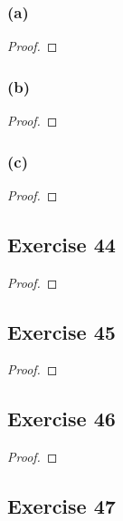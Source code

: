 \documentclass[14pt]{extarticle}
\begin{document}
\subsubsection{(a)}

\begin{proof}

\end{proof}

\subsubsection{(b)}

\begin{proof}

\end{proof}

\subsubsection{(c)}

\begin{proof}

\end{proof}

\subsection{Exercise 44}

\begin{proof}

\end{proof}

\subsection{Exercise 45}

\begin{proof}

\end{proof}

\subsection{Exercise 46}

\begin{proof}

\end{proof}

\subsection{Exercise 47}
\end{document}
